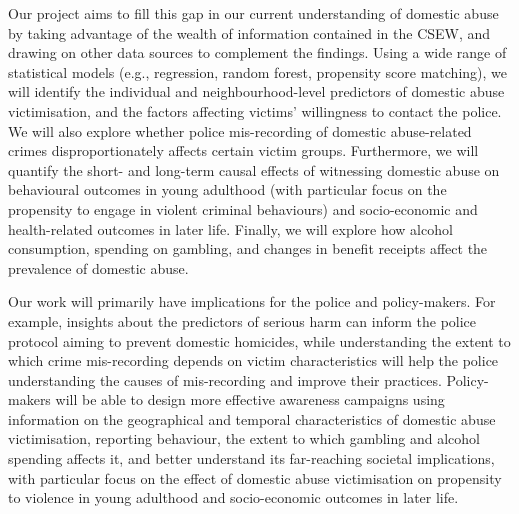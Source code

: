 \documentclass[11pt, a4paper]{article}
\begin{document}

Our project aims to fill this gap in our current understanding of domestic abuse by taking advantage of the wealth of information contained in the CSEW, and drawing on other data sources to complement the findings. Using a wide range of statistical models (e.g., regression, random forest, propensity score matching), we will identify the individual and neighbourhood-level predictors of domestic abuse victimisation, and the factors affecting victims' willingness to contact the police. We will also explore whether police mis-recording of domestic abuse-related crimes \cite{HerMajestysInspectorateofConstabularyandFires&RescueServices2019}  disproportionately affects certain victim groups. Furthermore, we will quantify the short- and long-term causal effects of witnessing domestic abuse on behavioural outcomes in young adulthood (with particular focus on the propensity to engage in violent criminal behaviours) and socio-economic and health-related outcomes in later life. Finally, we will explore how alcohol consumption, spending on gambling, and changes in benefit receipts affect the prevalence of domestic abuse.
 
 

Our work will primarily have implications for the police and policy-makers. For example, insights about the predictors of serious harm can inform the police protocol aiming to prevent domestic homicides, while understanding the extent to which crime mis-recording depends on victim characteristics will help the police understanding the causes of mis-recording and improve their practices. Policy-makers will be able to design more effective awareness campaigns using information on the geographical and temporal characteristics of domestic abuse victimisation, reporting behaviour, the extent to which gambling and alcohol spending affects it, and better understand its far-reaching societal implications, with particular focus on the effect of domestic abuse victimisation on propensity to violence in young adulthood and  socio-economic outcomes in later life. 
\end{document}
